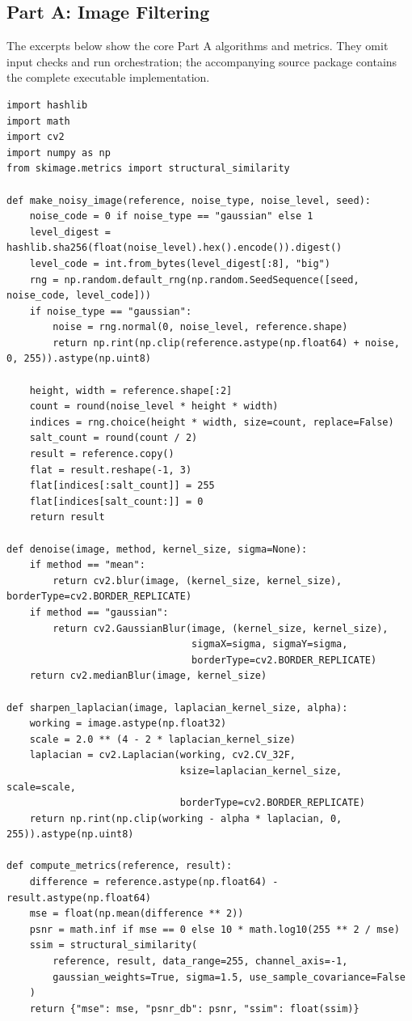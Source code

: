 \documentclass[a4paper,12pt]{article}
\begin{document}
\subsection{Part A: Image Filtering}
The excerpts below show the core Part A algorithms and metrics. They omit input checks and run orchestration; the accompanying source package contains the complete executable implementation.
\begin{lstlisting}
import hashlib
import math
import cv2
import numpy as np
from skimage.metrics import structural_similarity

def make_noisy_image(reference, noise_type, noise_level, seed):
    noise_code = 0 if noise_type == "gaussian" else 1
    level_digest = hashlib.sha256(float(noise_level).hex().encode()).digest()
    level_code = int.from_bytes(level_digest[:8], "big")
    rng = np.random.default_rng(np.random.SeedSequence([seed, noise_code, level_code]))
    if noise_type == "gaussian":
        noise = rng.normal(0, noise_level, reference.shape)
        return np.rint(np.clip(reference.astype(np.float64) + noise, 0, 255)).astype(np.uint8)

    height, width = reference.shape[:2]
    count = round(noise_level * height * width)
    indices = rng.choice(height * width, size=count, replace=False)
    salt_count = round(count / 2)
    result = reference.copy()
    flat = result.reshape(-1, 3)
    flat[indices[:salt_count]] = 255
    flat[indices[salt_count:]] = 0
    return result

def denoise(image, method, kernel_size, sigma=None):
    if method == "mean":
        return cv2.blur(image, (kernel_size, kernel_size), borderType=cv2.BORDER_REPLICATE)
    if method == "gaussian":
        return cv2.GaussianBlur(image, (kernel_size, kernel_size),
                                sigmaX=sigma, sigmaY=sigma,
                                borderType=cv2.BORDER_REPLICATE)
    return cv2.medianBlur(image, kernel_size)

def sharpen_laplacian(image, laplacian_kernel_size, alpha):
    working = image.astype(np.float32)
    scale = 2.0 ** (4 - 2 * laplacian_kernel_size)
    laplacian = cv2.Laplacian(working, cv2.CV_32F,
                              ksize=laplacian_kernel_size, scale=scale,
                              borderType=cv2.BORDER_REPLICATE)
    return np.rint(np.clip(working - alpha * laplacian, 0, 255)).astype(np.uint8)

def compute_metrics(reference, result):
    difference = reference.astype(np.float64) - result.astype(np.float64)
    mse = float(np.mean(difference ** 2))
    psnr = math.inf if mse == 0 else 10 * math.log10(255 ** 2 / mse)
    ssim = structural_similarity(
        reference, result, data_range=255, channel_axis=-1,
        gaussian_weights=True, sigma=1.5, use_sample_covariance=False
    )
    return {"mse": mse, "psnr_db": psnr, "ssim": float(ssim)}
\end{lstlisting}
\clearpage
\end{document}
